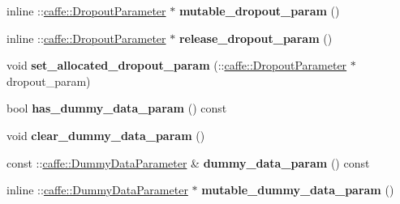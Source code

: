 \begin{DoxyCompactItemize}
\item 
\mbox{\label{classcaffe_1_1_v1_layer_parameter_a7b40c3f51f918528c14957caaade6136}} 
inline \+::\mbox{\hyperlink{classcaffe_1_1_dropout_parameter}{caffe\+::\+Dropout\+Parameter}} $\ast$ {\bfseries mutable\+\_\+dropout\+\_\+param} ()
\item 
\mbox{\label{classcaffe_1_1_v1_layer_parameter_a54d35283c6a624e61a599ee582d27ee6}} 
inline \+::\mbox{\hyperlink{classcaffe_1_1_dropout_parameter}{caffe\+::\+Dropout\+Parameter}} $\ast$ {\bfseries release\+\_\+dropout\+\_\+param} ()
\item 
\mbox{\label{classcaffe_1_1_v1_layer_parameter_ade3a2f1e968e0e0e63e015d8c31c00da}} 
void {\bfseries set\+\_\+allocated\+\_\+dropout\+\_\+param} (\+::\mbox{\hyperlink{classcaffe_1_1_dropout_parameter}{caffe\+::\+Dropout\+Parameter}} $\ast$dropout\+\_\+param)
\item 
\mbox{\label{classcaffe_1_1_v1_layer_parameter_a2fbbd2444e33636c714e582903262958}} 
bool {\bfseries has\+\_\+dummy\+\_\+data\+\_\+param} () const
\item 
\mbox{\label{classcaffe_1_1_v1_layer_parameter_ac0fdf838fe4bb3e21e07ada3df5017b8}} 
void {\bfseries clear\+\_\+dummy\+\_\+data\+\_\+param} ()
\item 
\mbox{\label{classcaffe_1_1_v1_layer_parameter_a3fe39a7e6f860715483b49df3cb820b9}} 
const \+::\mbox{\hyperlink{classcaffe_1_1_dummy_data_parameter}{caffe\+::\+Dummy\+Data\+Parameter}} \& {\bfseries dummy\+\_\+data\+\_\+param} () const
\item 
\mbox{\label{classcaffe_1_1_v1_layer_parameter_afb483ff8d5e303bbebd864466e0690ba}} 
inline \+::\mbox{\hyperlink{classcaffe_1_1_dummy_data_parameter}{caffe\+::\+Dummy\+Data\+Parameter}} $\ast$ {\bfseries mutable\+\_\+dummy\+\_\+data\+\_\+param} ()
\item 
\mbox{\label{classcaffe_1_1_v1_layer_parameter_a00f37c405a84d3d028a7829340fa9517}} 

\end{DoxyCompactItemize}
